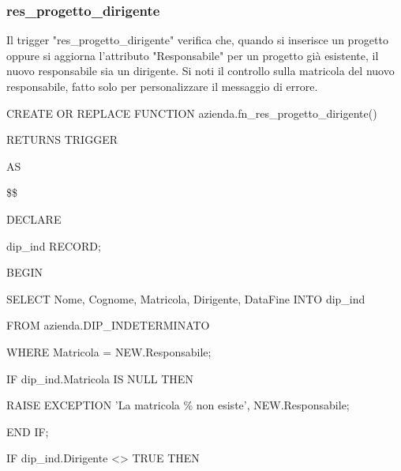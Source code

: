     \newpage

    \subsubsection{res\_progetto\_dirigente}
    Il trigger "res\_progetto\_dirigente" verifica che, quando si inserisce un progetto oppure si aggiorna l'attributo "Responsabile"
    per un progetto già esistente, il nuovo responsabile sia un dirigente.
    Si noti il controllo sulla matricola del nuovo responsabile, fatto solo per personalizzare il messaggio di errore.
    
    \ttfamily
        \begin{flushleft}
            \begin{description}
                \item CREATE OR REPLACE FUNCTION azienda.fn\_res\_progetto\_dirigente()
                \item RETURNS TRIGGER
                \item AS
                \item \$\$
                \item DECLARE
                \begin{description}
                    \item dip\_ind RECORD;
                \end{description}
                \item BEGIN
                \begin{description}
                    \item SELECT Nome, Cognome, Matricola, Dirigente, DataFine	INTO dip\_ind
                    \item FROM azienda.DIP\_INDETERMINATO
                    \item WHERE Matricola = NEW.Responsabile;
                    \item 
                    \item IF dip\_ind.Matricola IS NULL THEN
                    \vspace{0.2cm}
                    \begin{description}
                        \item RAISE EXCEPTION 'La matricola \% non esiste', NEW.Responsabile;
                    \end{description}
                    \item END IF;
                    \item 
                    \item IF dip\_ind.Dirigente <> TRUE THEN

\end{description}
\end{description}
\end{flushleft}
